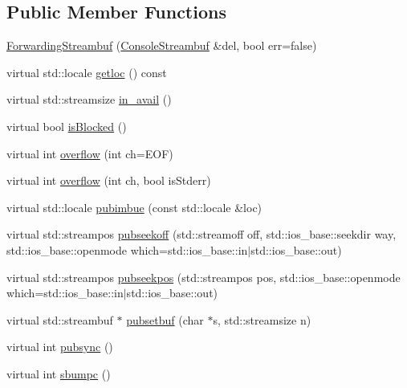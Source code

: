 \subsection*{Public Member Functions}
\begin{DoxyCompactItemize}
\item 
\mbox{\hyperlink{classsgl_1_1ForwardingStreambuf_a8117dcf1a6c10e98afb196a6f1346dd9}{Forwarding\+Streambuf}} (\mbox{\hyperlink{classsgl_1_1ConsoleStreambuf}{Console\+Streambuf}} \&del, bool err=false)
\item 
virtual std\+::locale \mbox{\hyperlink{classsgl_1_1ForwardingStreambuf_aaea5d5971e30e03408abc9b4b9cdd332}{getloc}} () const
\item 
virtual std\+::streamsize \mbox{\hyperlink{classsgl_1_1ForwardingStreambuf_a7c3ad202fdca7b02e80cce27e4fe009e}{in\+\_\+avail}} ()
\item 
virtual bool \mbox{\hyperlink{classsgl_1_1ForwardingStreambuf_a61d5d93ba4956eefeb2e3d617d34c801}{is\+Blocked}} ()
\item 
virtual int \mbox{\hyperlink{classsgl_1_1ForwardingStreambuf_adccb3cd5475ba3c83bc2b0a8cbd731c0}{overflow}} (int ch=E\+OF)
\item 
virtual int \mbox{\hyperlink{classsgl_1_1ForwardingStreambuf_a5cfed6bdc955e2129ced962625045f8e}{overflow}} (int ch, bool is\+Stderr)
\item 
virtual std\+::locale \mbox{\hyperlink{classsgl_1_1ForwardingStreambuf_a4b6e7141e08afcaf0fbe64222218d291}{pubimbue}} (const std\+::locale \&loc)
\item 
virtual std\+::streampos \mbox{\hyperlink{classsgl_1_1ForwardingStreambuf_a19deb4f37c57fc93e0047e3db4f9d41e}{pubseekoff}} (std\+::streamoff off, std\+::ios\+\_\+base\+::seekdir way, std\+::ios\+\_\+base\+::openmode which=std\+::ios\+\_\+base\+::in$\vert$std\+::ios\+\_\+base\+::out)
\item 
virtual std\+::streampos \mbox{\hyperlink{classsgl_1_1ForwardingStreambuf_aa603647db2d03b8bde5e5782b6472575}{pubseekpos}} (std\+::streampos pos, std\+::ios\+\_\+base\+::openmode which=std\+::ios\+\_\+base\+::in$\vert$std\+::ios\+\_\+base\+::out)
\item 
virtual std\+::streambuf $\ast$ \mbox{\hyperlink{classsgl_1_1ForwardingStreambuf_a7d5bdeefe1c21ccce88dccedff1ab495}{pubsetbuf}} (char $\ast$s, std\+::streamsize n)
\item 
virtual int \mbox{\hyperlink{classsgl_1_1ForwardingStreambuf_a104a7d4fba2c0e96a198cedb7c8cfa5f}{pubsync}} ()
\item 
virtual int \mbox{\hyperlink{classsgl_1_1ForwardingStreambuf_a91a2d4b5d9c771f559543d68806820a6}{sbumpc}} ()

\end{DoxyCompactItemize}
